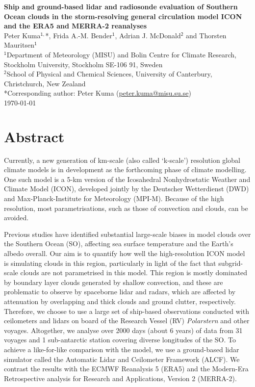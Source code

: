 \documentclass[12pt,a4paper]{article}
\begin{document}
\begin{center} \Large \sffamily\textbf{Ship and ground-based lidar and radiosonde evaluation of Southern Ocean clouds in the storm-resolving general circulation model ICON and the ERA5 and MERRA-2 reanalyses}\\[0.4cm]
\large Peter Kuma$^\mathsf{1,}$*, Frida A.-M. Bender$^\mathsf{1}$, Adrian J. McDonald$^\mathsf{2}$ and Thorsten Mauritsen$^\mathsf{1}$\\[0.4cm]
\small
$^\mathsf{1}$Department of Meteorology (MISU) and Bolin Centre for Climate Research, Stockholm University, Stockholm SE-106 91, Sweden\\[0.2cm]
$^\mathsf{2}$School of Physical and Chemical Sciences, University of Canterbury, Christchurch, New Zealand\\[0.2cm]
*Corresponding author: Peter Kuma (\href{mailto:peter.kuma@misu.su.se}{peter.kuma@misu.su.se})\\[0.4cm]
\large \today\\[0.4cm]

\end{center}

\section*{Abstract}

Currently, a new generation of km-scale (also called `k-scale') resolution
global climate models is in development as the forthcoming phase of climate
modelling. One such model is a 5-km version of the Icosahedral Nonhydrostatic
Weather and Climate Model (ICON), developed jointly by the Deutscher
Wetterdienst (DWD) and Max-Planck-Institute for Meteorology (MPI-M). Because of
the high resolution, most parametrisations, such as those of convection and
clouds, can be avoided.

Previous studies have identified substantial large-scale biases in model clouds
over the Southern Ocean (SO), affecting sea surface temperature and the Earth's
albedo overall. Our aim is to quantify how well the high-resolution ICON model
is simulating clouds in this region, particularly in light of the fact that
subgrid-scale clouds are not parametrised in this model. This region is mostly
dominated by boundary layer clouds generated by shallow convection, and these
are problematic to observe by spaceborne lidar and radars, which are affected
by attenuation by overlapping and thick clouds and ground clutter,
respectively. Therefore, we choose to use a large set of ship-based
observations conducted with ceilometers and lidars on board of the Research
Vessel (RV) \textit{Polarstern} and other voyages. Altogether, we analyse over
2000 days (about 6 years) of data from 31 voyages and 1 sub-antarctic station
covering diverse longitudes of the SO. To achieve a like-for-like comparison
with the model, we use a ground-based lidar simulator called the Automatic
Lidar and Ceilometer Framework (ALCF). We contrast the results with the ECMWF
Reanalysis 5 (ERA5) and the Modern-Era Retrospective analysis for Research and
Applications, Version 2 (MERRA-2).
\end{document}

